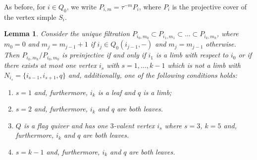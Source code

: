 \documentclass{amsart}
\newcommand{\sayT}[1]{\say[T]{#1}}
\newtheorem{lemma}[theorem]{Lemma}
\numberwithin{equation}{section}
\begin{document}
  As before, for $i\in Q_0$, we write $P_{i,m}=\tau^{-m}P_i$, where $P_i$ is the projective cover of the vertex simple $S_i$.  
  \begin{lemma}
    Consider the unique filtration $P_{i_0,m_0}\subset P_{i_1,m_1}\subset\ldots\subset P_{i_k,m_k}$, where $m_0=0$ and $m_j=m_{j-1}+1$ if $i_j\in Q_0(i_{j-1},-)$ and $m_j=m_{j-1}$ otherwise.
    Then $P_{i_k,m_k}/P_{i_0,m_0}$ is preinjective if and only if $i_1$ is a limb with respect to $i_0$ or if there exists at most one vertex $i_s$ with $s=1,\ldots, k-1$  which is not a limb with $N_{i_s}=\{i_{s-1},i_{s+1}, q\}$ and, additionally, one of the following conditions holds: 
		\begin{enumerate}
		
		\item $s=1$ and, furthermore, $i_k$ is a leaf and $q$ is a limb;
		\item $s=2$ and, furthermore, $i_k$ and $q$ are both leaves.
		\item $Q$ is a flag quiver and has one $3$-valent vertex $i_s$ where $s=3$, $k=5$ and, furthermore, $i_k$ and $q$ are both leaves. 
		\item $s=k-1$ and, furthermore, $i_k$ and $q$ are both leaves.
		\end{enumerate}
\end{lemma}
\end{document}
